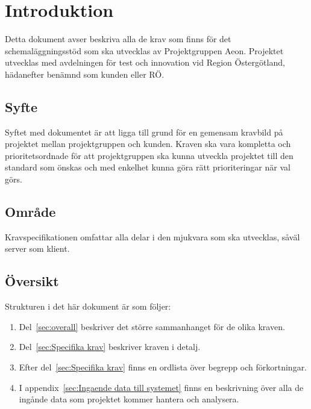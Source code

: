 \documentclass{article}
\begin{document}
\def\ftitle{Kravspecifikation}
\def\fversion{1.0}




\section{Introduktion}
Detta dokument avser beskriva alla de krav som finns för det schemaläggningsstöd
som ska utvecklas av Projektgruppen Aeon. Projektet utvecklas med avdelningen för test
och innovation vid Region Östergötland, hädanefter benämnd som kunden eller RÖ.

\subsection{Syfte}
Syftet med dokumentet är att ligga till grund för en gemensam kravbild på
projektet mellan projektgruppen och kunden. Kraven ska vara kompletta och
prioritetsordnade för att projektgruppen ska kunna utveckla projektet till den
standard som önskas och med enkelhet kunna göra rätt prioriteringar när val görs.

\subsection{Område}
Kravspecifikationen omfattar alla delar i den mjukvara som ska utvecklas, såväl
server som klient.

\subsection{Översikt}
Strukturen i det här dokument är som följer:

\begin{enumerate}
\item Del~\ref{sec:overall} beskriver det större sammanhanget för de olika
kraven.
\item Del~\ref{sec:Specifika krav} beskriver kraven i detalj.
\item Efter del~\ref{sec:Specifika krav} finns en ordlista över begrepp och
förkortningar.
\item I appendix~\ref{sec:Ingaende data till systemet} finns en beskrivning
över alla de ingånde data som projektet kommer hantera och analysera.

\end{enumerate}

\end{document}
